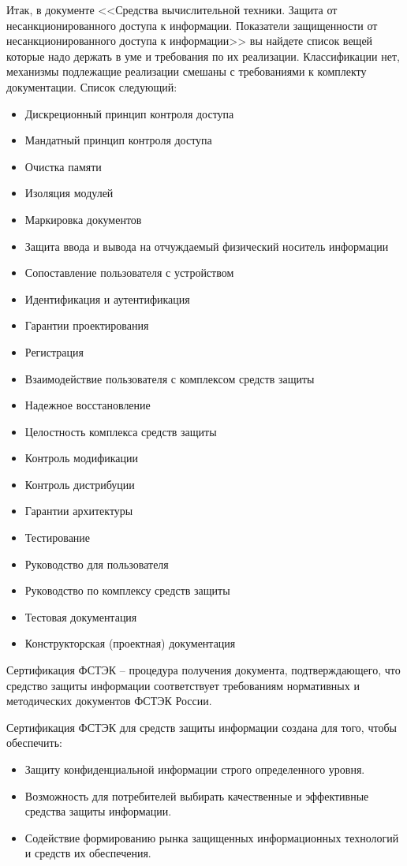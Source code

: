 Итак, в документе <<Средства вычислительной техники. Защита от несанкционированного доступа к информации. Показатели защищенности от несанкционированного доступа к информации>> вы найдете список вещей которые надо держать в уме и требования по их реализации. Классификации нет, механизмы подлежащие реализации смешаны с требованиями к комплекту документации.
Список следующий:
\begin{itemize}
	\item Дискреционный принцип контроля доступа
	\item Мандатный принцип контроля доступа
	\item Очистка памяти
	\item Изоляция модулей
	\item Маркировка документов
	\item Защита ввода и вывода на отчуждаемый физический носитель информации
	\item Сопоставление пользователя с устройством
	\item Идентификация и аутентификация
	\item Гарантии проектирования
	\item Регистрация
	\item Взаимодействие пользователя с комплексом средств защиты
	\item Надежное восстановление
	\item Целостность комплекса средств защиты
	\item Контроль модификации
	\item Контроль дистрибуции
	\item Гарантии архитектуры
	\item Тестирование
	\item Руководство для пользователя
	\item Руководство по комплексу средств защиты
	\item Тестовая документация
	\item Конструкторская (проектная) документация
\end{itemize}

Сертификация ФСТЭК – процедура получения документа, подтверждающего, что средство защиты информации соответствует требованиям нормативных и методических документов ФСТЭК России.

Сертификация ФСТЭК для средств защиты информации создана для того, чтобы обеспечить:
\begin{itemize}
    \item Защиту конфиденциальной информации строго определенного уровня.
    \item Возможность для потребителей выбирать качественные и эффективные средства защиты информации.
    \item Содействие формированию рынка защищенных информационных технологий и средств их обеспечения.
\end{itemize}

